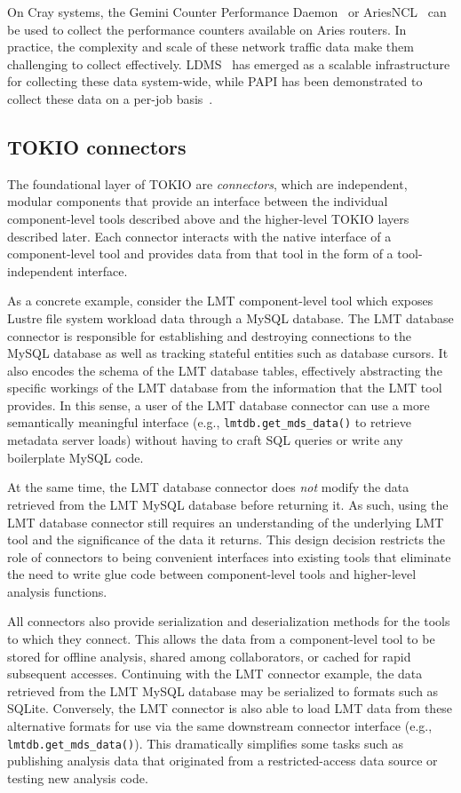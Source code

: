 On Cray systems, the Gemini Counter Performance Daemon~\cite{Pedretti2013,Brandt2016} or AriesNCL~\cite{ariesncl} can be used to collect the performance counters available on Aries routers.
In practice, the complexity and scale of these network traffic data make them challenging to collect effectively.
LDMS~\cite{Agelastos2014ldms} has emerged as a scalable infrastructure for collecting these data system-wide, while PAPI has been demonstrated to collect these data on a per-job basis~\cite{Groves2017}.

\subsection{TOKIO connectors} \label{sec:architecture/connectors}

The foundational layer of TOKIO are \emph{connectors}, which are independent, modular components that provide an interface between the individual component-level tools described above and the higher-level TOKIO layers described later.
Each connector interacts with the native interface of a component-level tool and provides data from that tool in the form of a tool-independent interface.

As a concrete example, consider the LMT component-level tool which exposes Lustre file system workload data through a MySQL database.
The LMT database connector is responsible for establishing and destroying connections to the MySQL database as well as tracking stateful entities such as database cursors.
It also encodes the schema of the LMT database tables, effectively abstracting the specific workings of the LMT database from the information that the LMT tool provides.
In this sense, a user of the LMT database connector can use a more semantically meaningful interface (e.g., \texttt{lmtdb.get\_mds\_data()} to retrieve metadata server loads) without having to craft SQL queries or write any boilerplate MySQL code.

At the same time, the LMT database connector does \emph{not} modify the data retrieved from the LMT MySQL database before returning it.
As such, using the LMT database connector still requires an understanding of the underlying LMT tool and the significance of the data it returns.
This design decision restricts the role of connectors to being convenient interfaces into existing tools that eliminate the need to write glue code between component-level tools and higher-level analysis functions.

All connectors also provide serialization and deserialization methods for the tools to which they connect.
This allows the data from a component-level tool to be stored for offline analysis, shared among collaborators, or cached for rapid subsequent accesses.
Continuing with the LMT connector example, the data retrieved from the LMT MySQL database may be serialized to formats such as SQLite.
Conversely, the LMT connector is also able to load LMT data from these alternative formats for use via the same downstream connector interface (e.g., \texttt{lmtdb.get\_mds\_data()}).
This dramatically simplifies some tasks such as publishing analysis data that originated from a restricted-access data source or testing new analysis code.

